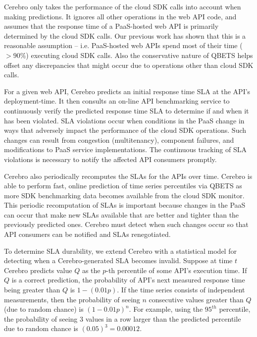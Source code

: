 Cerebro only takes the performance of the cloud SDK calls into account
when making predictions. It ignores all other operations in the web API code, and
assumes that the response time of a PaaS-hosted web API is primarily determined
by the cloud SDK calls. Our previous work has shown that this is a reasonable
assumption -- i.e. PaaS-hosted web APIs spend most of their time ($> 90\%$) executing cloud 
SDK calls. Also the conservative nature of QBETS
helps offset any discrepancies that might occur due to operations other than cloud SDK calls.
 

For a given web API, Cerebro predicts an initial response time SLA
at the API's deployment-time. It then consults an on-line API benchmarking
service to continuously verify the predicted response time SLA
to determine if and when it has been violated.
SLA violations occur when conditions in the PaaS change in
ways that adversely impact the performance of the cloud SDK operations. 
Such changes can result
from congestion (multitenancy), component failures, and modifications to
PaaS service implementations. The continuous tracking of SLA violations is
necessary to notify the affected API consumers promptly.

Cerebro also periodically recomputes the SLAs for the APIs over time. 
Cerebro is able to perform fast, online
prediction of time series percentiles via QBETS as more SDK benchmarking data becomes 
available from the cloud SDK monitor.
This periodic recomputation of SLAs is important because changes in the PaaS
can occur that make new SLAs available that are better and tighter than the
previously predicted ones. Cerebro must detect when such
changes occur so that API consumers can be notified and SLAs renegotiated.

To determine SLA durability, we extend Cerebro with a 
statistical model for detecting when a Cerebro-generated SLA becomes invalid. 
Suppose at time $t$ Cerebro predicts value $Q$ as the $p$-th percentile of
some API's execution time.  If $Q$ is a correct prediction,
the probability of API's next measured response time being greater than 
$Q$ is $1-(0.01p)$.  If the time series consists of independent
measurements, then the probability of seeing $n$ consecutive values greater
than $Q$ (due to random chance) is $(1-0.01p)^n$. 
For example, using the $95^{th}$ percentile, the probability of seeing $3$
values in a row larger than the predicted percentile due to random chance
is $(0.05)^3 = 0.00012$.

